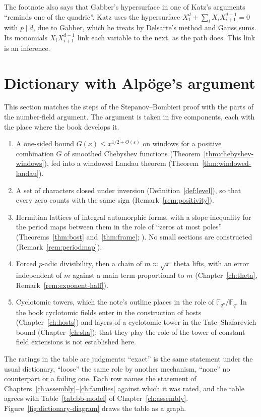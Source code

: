 \documentclass[11pt]{amsbook}
\theoremstyle{plain}
\theoremstyle{definition}
\theoremstyle{remark}
\numberwithin{equation}{section}
\numberwithin{figure}{chapter}
\numberwithin{table}{chapter}
\newcommand{\F}{\mathbb{F}}
\begin{document}
The footnote also says that Gabber's hypersurface in one of Katz's
arguments ``reminds one of the quadric''. Katz \cite{Katz2015} uses
the hypersurface $X_1^d + \sum_i X_iX_{i+1}^{d-1} = 0$ with
$p \mid d$, due to Gabber, which he treats by Delsarte's method and
Gauss sums. Its monomials $X_iX_{i+1}^{d-1}$ link each variable to
the next, as the path does. This link is an inference.

\section{Dictionary with Alp\"oge's argument}
\label{sec:dictionary}

This section matches the steps of the Stepanov--Bombieri proof with
the parts of the number-field argument. The argument is taken in
five components, each with the place where the book develops it.
\begin{enumerate}[label=(\roman*)]
\item A one-sided bound $G(x)\le x^{1/2+O(\varepsilon)}$ on windows
for a positive combination $G$ of smoothed Chebyshev functions
(Theorem~\ref{thm:chebyshev-windows}), fed into a windowed Landau
theorem (Theorem~\ref{thm:windowed-landau}).
\item A set of characters closed under inversion
(Definition~\ref{def:level}), so that every zero counts with the
same sign (Remark~\ref{rem:positivity}).
\item Hermitian lattices of integral automorphic forms, with a
slope inequality for the period maps between them in the role of
``zeros at most poles'' (Theorems~\ref{thm:bost}
and~\ref{thm:frame}; \cite{Bost1996}). No small sections are
constructed (Remark~\ref{rem:periodmap}).
\item Forced $p$-adic divisibility, then a chain of
$m\approx\sqrt x$ theta lifts, with an error independent of $m$
against a main term proportional to $m$
(Chapter~\ref{ch:theta}, Remark~\ref{rem:exponent-half}).
\item Cyclotomic towers, which the note's outline places in the
role of $\F_{q^n}/\F_q$. In the book cyclotomic fields enter in the
construction of hosts (Chapter~\ref{ch:hosts}) and layers of a
cyclotomic tower in the Tate--Shafarevich bound
(Chapter~\ref{ch:sha}); that they play the role of the tower of
constant field extensions is not established here.
\end{enumerate}
The ratings in the table are judgments: ``exact'' is the same
statement under the usual dictionary, ``loose'' the same role by
another mechanism, ``none'' no counterpart or a failing one. Each
row names the statement of
Chapters~\ref{ch:assembly}--\ref{ch:families} against which it was
rated, and the table agrees with Table~\ref{tab:bb-model} of
Chapter~\ref{ch:assembly}. Figure~\ref{fig:dictionary-diagram}
draws the table as a graph.
\end{document}
